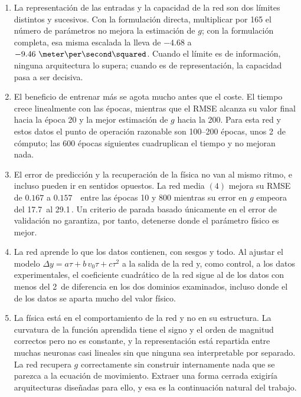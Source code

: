\documentclass[titlepage,11pt]{article}
\providecommand{\num}[1]{\ensuremath{#1}}
\providecommand{\SI}[2]{#1\,#2}
\providecommand{\percent}{\char37\relax}
\begin{document}
\begin{enumerate}
\item La representación de las entradas y la capacidad de la red son dos
  límites distintos y sucesivos. Con la formulación directa, multiplicar por
  165 el número de parámetros no mejora la estimación de $g$; con la
  formulación completa, esa misma escalada la lleva de $\num{-4.68}$ a
  $\num{-9.46}~\meter\per\second\squared$. Cuando el límite es de información,
  ninguna arquitectura lo supera; cuando es de representación, la capacidad
  pasa a ser decisiva.

\item El beneficio de entrenar más se agota mucho antes que el coste. El tiempo
  crece linealmente con las épocas, mientras que el RMSE alcanza su valor final
  hacia la época 20 y la mejor estimación de $g$ hacia la 200. Para esta red y
  estos datos el punto de operación razonable son 100--200 épocas, unos
  \SI{2}{\second} de cómputo; las 600 épocas siguientes cuadruplican el tiempo
  y no mejoran nada.

\item El error de predicción y la recuperación de la física no van al mismo
  ritmo, e incluso pueden ir en sentidos opuestos. La red media $(4)$ mejora su
  RMSE de \num{0.167} a \num{0.157}~\meter\ entre las épocas 10 y 800 mientras
  su error en $g$ empeora del \SI{17.7}{\percent} al \SI{29.1}{\percent}. Un
  criterio de parada basado únicamente en el error de validación no garantiza,
  por tanto, detenerse donde el parámetro físico es mejor.

\item La red aprende lo que los datos contienen, con sesgos y todo. Al ajustar
  el modelo $\Delta y = a\tau + b\,v_0\tau + c\tau^2$ a la salida de la red y,
  como control, a los datos experimentales, el coeficiente cuadrático de la red
  sigue al de los datos con menos del \SI{2}{\percent} de diferencia en los dos
  dominios examinados, incluso donde el de los datos se aparta mucho del valor
  físico.

\item La física está en el comportamiento de la red y no en su estructura. La
  curvatura de la función aprendida tiene el signo y el orden de magnitud
  correctos pero no es constante, y la representación está repartida entre
  muchas neuronas casi lineales sin que ninguna sea interpretable por separado.
  La red recupera $g$ correctamente sin construir internamente nada que se
  parezca a la ecuación de movimiento. Extraer una forma cerrada exigiría
  arquitecturas diseñadas para ello, y esa es la continuación natural del
  trabajo.


\end{enumerate}
\end{document}
